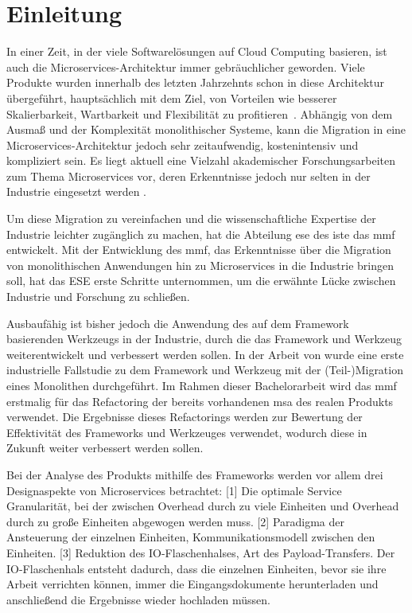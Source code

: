 \chapter{Einleitung}
\label{chap:einleitung}

In einer Zeit, in der viele Softwarelösungen auf Cloud Computing basieren, ist auch die Mi\-cro\-services-Architektur immer gebräuchlicher geworden.
Viele Produkte wurden innerhalb des letzten Jahrzehnts schon in diese Architektur übergeführt, hauptsächlich mit dem Ziel, von Vorteilen wie besserer Skalierbarkeit, Wartbarkeit und Flexibilität zu profitieren~\cite{Fritzsch_2019,taibi2017processmotivations}.
Abhängig von dem Ausmaß und der Komplexität monolithischer Systeme, kann die Migration in eine Microservices-Architektur jedoch sehr zeitaufwendig, kostenintensiv und kompliziert sein.
Es liegt aktuell eine Vielzahl akademischer Forschungsarbeiten zum Thema Microservices vor, deren Erkenntnisse jedoch nur selten in der Industrie eingesetzt werden \cite{fritzsch2022architecturecentric}.

Um diese Migration zu vereinfachen und die wissenschaftliche Expertise der Industrie leichter zugänglich zu machen, hat die Abteilung \gls{ese} des \gls{iste} das \acrfull{mmf} entwickelt.
Mit der Entwicklung des \gls{mmf}, das Erkenntnisse über die Migration von monolithischen Anwendungen hin zu Microservices in die Industrie bringen soll, hat das ESE erste Schritte unternommen, um die erwähnte Lücke zwischen Industrie und Forschung zu schließen.

Ausbaufähig ist bisher jedoch die Anwendung des auf dem Framework basierenden Werkzeugs in der Industrie, durch die das Framework und Werkzeug weiterentwickelt und verbessert werden sol\-len.
In der Arbeit von  wurde eine erste industrielle Fallstudie zu dem Framework und Werkzeug mit der (Teil-)Migration eines Monolithen durchgeführt.
Im Rahmen dieser Bachelorarbeit wird das \acrshort{mmf} erstmalig für das Refactoring der bereits vorhandenen \gls{msa} des realen Produkts \jf verwendet.
Die Ergebnisse dieses Refactorings werden zur Bewertung der Effektivität des Frameworks und Werkzeuges verwendet, wodurch diese in Zukunft weiter verbessert werden sollen.

Bei der Analyse des Produkts mithilfe des Frameworks werden vor allem drei Designaspekte von Microservices betrachtet:
[1] Die optimale Service Granularität, bei der zwischen Overhead durch zu viele Einheiten und Overhead durch zu große Einheiten abgewogen werden muss.
[2] Paradigma der Ansteuerung der einzelnen Einheiten, Kommunikationsmodell zwischen den Einheiten.
[3] Reduktion des IO-Flaschenhalses, Art des Payload-Transfers.
Der IO-Flaschenhals entsteht dadurch, dass die einzelnen Einheiten, bevor sie ihre Arbeit verrichten können, immer die Eingangsdokumente herunterladen und anschließend die Ergebnisse wieder hochladen müssen.

